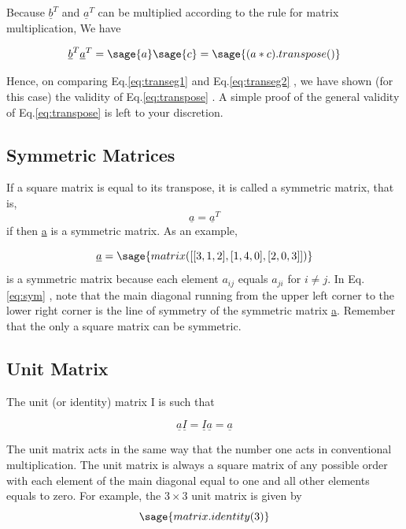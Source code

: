 \documentclass[12pt]{report}
\newcommand{\lab}[1]{
Eq.\ref{#1}
}
\begin{document}
Because $\underline{b}^T$ and $\underline{a}^T$ can be multiplied
according to the rule for matrix multiplication, We have

\begin{equation} \underline{b}^T\underline{a}^T = \sage{a} \sage{c} = \sage{(a*c).transpose()}\label{eq:transeg2}\end{equation}

Hence, on comparing \lab{eq:transeg1} and \lab{eq:transeg2}, we have shown (for this
case) the validity of \lab{eq:transpose}. A simple proof of the general
validity of \lab{eq:transpose} is left to your discretion.
\subsection{Symmetric Matrices}
If a square matrix is equal to its transpose, it is called a symmetric
matrix, that is,
\begin{equation} \underline{a} = \underline{a}^T \end{equation}
 if then \underline{a} is a symmetric matrix. As an
example,

\begin{equation}\underline{a}=\sage{matrix([[3,1,2],[1,4,0],[2,0,3]])}\label{eq:sym}\end{equation}
is a symmetric matrix because each element $a_{{ij}}$ equals $a_{{ji}}$ for $i
\neq j$. In \lab{eq:sym}, note that the main diagonal running from the
upper left corner to the lower right corner is the line of symmetry of
the symmetric matrix \underline{a}. Remember that the only a square
matrix can be symmetric.
\subsection{Unit Matrix}
The unit (or identity) matrix I is such that

\begin{equation}\underline{a}\underline{I}=\underline{I}\underline{a}=\underline{a}\end{equation}

The unit matrix acts in the same way that the number one acts in
conventional multiplication. The unit matrix is always a square matrix
of any possible order with each element of the main diagonal equal to
one and all other elements equals to zero. For example, the $3 \times 3$
unit matrix is given by
\begin{equation}\sage{matrix.identity(3)}\end{equation}
\end{document}
